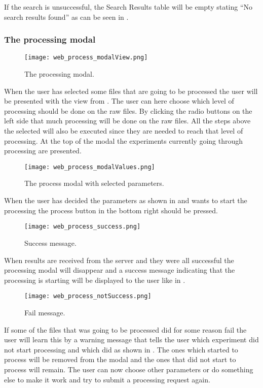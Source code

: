 If the search is unsuccessful, the Search Results table will be empty stating “No search results found” as can be seen in .

\pagebreak
\subsubsection{The processing modal}
\begin{figure}[h]
\centering
\texttt{[image: web\_process\_modalView.png]}
\caption{\label{fig:web_process_modalView}The processing modal.}
\end{figure}
\FloatBarrier
When the user has selected some files that are going to be processed the user will be presented with the view from . The user can here choose which level of processing should be done on the raw files.
By clicking the radio buttons on the left side that much processing will be done on the raw files. All the steps above the selected will also be executed since they are needed to reach that level of processing.
At the top of the modal the experiments currently going through processing are presented.
\begin{figure}[h]
\centering
\texttt{[image: web\_process\_modalValues.png]}
\caption{\label{fig:web_process_modalValues}The process modal with selected parameters.}
\end{figure}
\FloatBarrier
When the user has decided the parameters as shown in  and wants to start the processing the process button in the bottom right should be pressed. 
\begin{figure}[h]
\centering
\texttt{[image: web\_process\_success.png]}
\caption{\label{fig:web_process_success}Success message.}
\end{figure}
\FloatBarrier
When results are received from the server and they were all successful the processing modal will disappear and a success message indicating that the processing is starting will be displayed to the user like in .
\begin{figure}[h]
\centering
\texttt{[image: web\_process\_notSuccess.png]}
\caption{\label{fig:web_process_notSuccess}Fail message.}
\end{figure}
If some of the files that was going to be processed did for some reason fail the user will learn this by a warning message that tells the user which experiment did not start processing and which did as shown in . The ones which started to process will be removed from the modal and the ones that did not start to process will remain. The user can now choose other parameters or do something else to make it work and try to submit a processing request again.
\pagebreak
